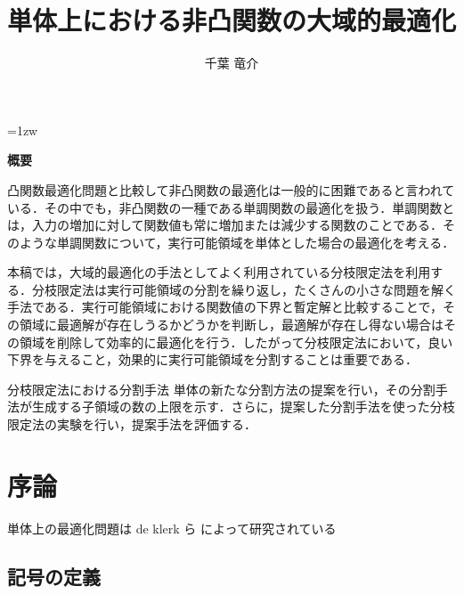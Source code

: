 \documentclass[a4paper,11pt]{jreport}
\title{単体上における非凸関数の大域的最適化}
\author{千葉 竜介}
\begin{document}
\maketitle
\thispagestyle{empty}
\newpage

\thispagestyle{empty}
\vspace*{20pt plus 1fil}
\parindent=1zw
\noindent
\begin{center}
{\bf 概要}
\vspace{5mm}
\end{center}

凸関数最適化問題と比較して非凸関数の最適化は一般的に困難であると言われている．その中でも，非凸関数の一種である単調関数の最適化を扱う．単調関数とは，入力の増加に対して関数値も常に増加または減少する関数のことである．そのような単調関数について，実行可能領域を単体とした場合の最適化を考える．\par
本稿では，大域的最適化の手法としてよく利用されている分枝限定法を利用する．分枝限定法は実行可能領域の分割を繰り返し，たくさんの小さな問題を解く手法である．実行可能領域における関数値の下界と暫定解と比較することで，その領域に最適解が存在しうるかどうかを判断し，最適解が存在し得ない場合はその領域を削除して効率的に最適化を行う．したがって分枝限定法において，良い下界を与えること，効果的に実行可能領域を分割することは重要である．\par
分枝限定法における分割手法
単体の新たな分割方法の提案を行い，その分割手法が生成する子領域の数の上限を示す．さらに，提案した分割手法を使った分枝限定法の実験を行い，提案手法を評価する．\par

\par
\vspace{0pt plus 1fil}
\newpage

\tableofcontents
\listoffigures

\pagebreak
\setcounter{page}{1}

\chapter{序論}

単体上の最適化問題は de klerk ら \cite{deklerk2} によって研究されている

\section{記号の定義}
\end{document}

